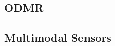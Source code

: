\cite{Zhou2023}

\subsection{ODMR}
\cite{PhysRevB.101.064102}


\cite{Wolfowicz2017}

\subsection{Multimodal Sensors}
\cite{Anisimov2016}

\cite{PhysRevB.100.094104}


\cite{Liu2022}


\cite{PhysRevApplied.8.044015}


